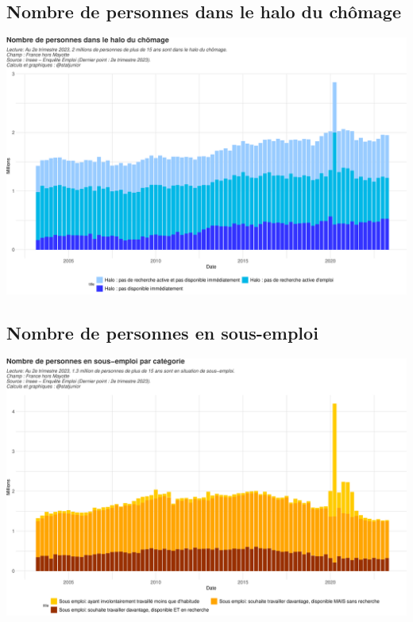 \documentclass[
  paper=a4,
  ,captions=tableheading
]{scrartcl}
\begin{document}
\hypertarget{nombre-de-personnes-dans-le-halo-du-chuxf4mage}{%
\subsection{Nombre de personnes dans le halo du
chômage}\label{nombre-de-personnes-dans-le-halo-du-chuxf4mage}}

\includegraphics{rapport_activite_emploi_chomage_insee_files/figure-latex/unnamed-chunk-25-1.pdf}

\hypertarget{nombre-de-personnes-en-sous-emploi}{%
\subsection{Nombre de personnes en
sous-emploi}\label{nombre-de-personnes-en-sous-emploi}}

\includegraphics{rapport_activite_emploi_chomage_insee_files/figure-latex/unnamed-chunk-28-1.pdf}
\end{document}
